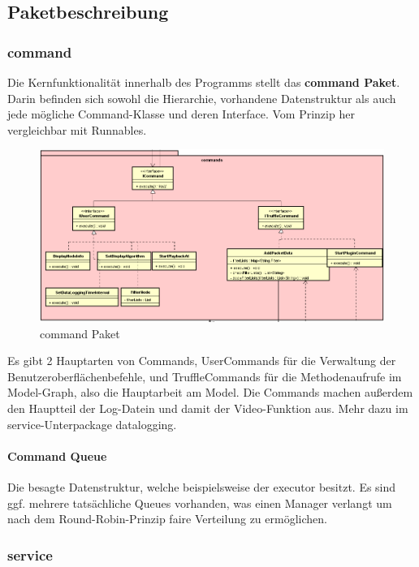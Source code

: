 \subsection{Paketbeschreibung}

\subsubsection{command}

Die Kernfunktionalität innerhalb des Programms stellt das \textbf{command Paket}.
Darin befinden sich sowohl die Hierarchie, vorhandene Datenstruktur als auch jede
mögliche Command-Klasse und deren Interface. Vom Prinzip her vergleichbar mit
Runnables.\newline

\begin{figure}[H]
  \centering
  \includegraphics[width=\textwidth]{../diagramimages/commands.png}
  \caption{command Paket}
\end{figure}

Es gibt 2 Hauptarten von Commands, UserCommands für die Verwaltung der
Benutzeroberflächenbefehle, und TruffleCommands für die Methodenaufrufe im
Model-Graph, also die Hauptarbeit am Model. Die Commands machen außerdem den
Hauptteil der Log-Datein und damit der Video-Funktion aus. Mehr dazu im
service-Unterpackage datalogging.

\paragraph{Command Queue}
Die besagte Datenstruktur, welche beispielsweise der executor besitzt. Es
sind ggf. mehrere tatsächliche Queues vorhanden, was einen Manager verlangt
um nach dem Round-Robin-Prinzip faire Verteilung zu ermöglichen.


\subsubsection{service}


